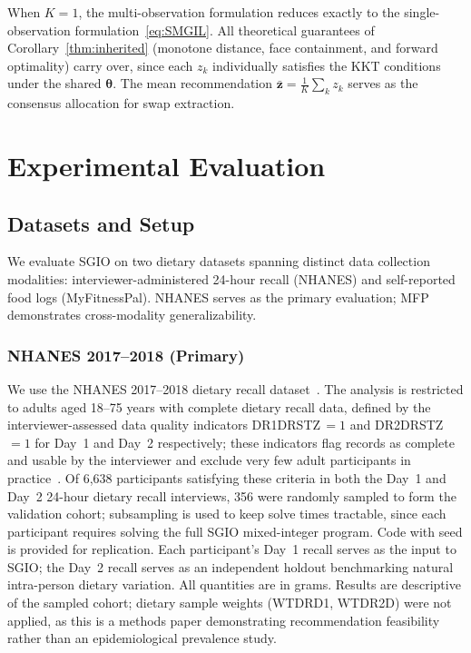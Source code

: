 \documentclass[journal]{IEEEtran}
\newcommand{\btheta}{\boldsymbol{\theta}}
\newcommand{\zmean}{\bar{\mathbf{z}}}
\begin{document}
When $K = 1$, the multi-observation formulation reduces exactly to the
single-observation formulation~\eqref{eq:SMGIL}. All theoretical
guarantees of Corollary~\ref{thm:inherited} (monotone distance, face
containment, and forward optimality) carry over, since each $z_k$
individually satisfies the KKT conditions under the shared $\btheta$.
The mean recommendation $\zmean = \frac{1}{K}\sum_k z_k$ serves as the
consensus allocation for swap extraction.

\section{Experimental Evaluation}
\label{sec:experiments}

\subsection{Datasets and Setup}
\label{subsec:setup}

We evaluate SGIO on two dietary datasets spanning distinct data
collection modalities: interviewer-administered 24-hour recall (NHANES)
and self-reported food logs (MyFitnessPal). NHANES serves as the primary
evaluation; MFP demonstrates cross-modality generalizability.

\subsubsection{NHANES 2017--2018 (Primary)}
\label{subsubsec:nhanes_setup}

We use the NHANES 2017--2018 dietary recall
dataset~\cite{CDC_2020}. The analysis is restricted to adults
aged 18--75 years with complete dietary recall data, defined by the
interviewer-assessed data quality indicators DR1DRSTZ\,$= 1$ and
DR2DRSTZ\,$= 1$ for Day~1 and Day~2 respectively; these indicators flag
records as complete and usable by the interviewer and exclude very few
adult participants in practice~\cite{CDC_2020}. Of 6,638 participants
satisfying these criteria in both the Day~1 and Day~2 24-hour dietary
recall interviews, 356 were randomly sampled to form the validation
cohort; subsampling is used to keep solve times tractable, since each
participant requires solving the full SGIO mixed-integer program. Code
with seed is provided for replication. Each participant's Day~1 recall
serves as the input to SGIO; the Day~2 recall serves as an independent
holdout benchmarking natural intra-person dietary variation. All
quantities are in grams. Results are descriptive of the sampled cohort;
dietary sample weights (WTDRD1, WTDR2D) were not applied, as this is a
methods paper demonstrating recommendation feasibility rather than an
epidemiological prevalence study.
\end{document}
